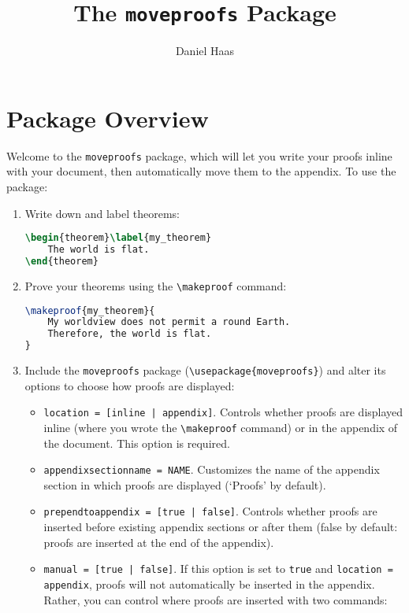 \documentclass{article}
\title{\vspace{-2.75cm}The \texttt{moveproofs} Package}
\author{Daniel Haas}
\newtheorem{theorem}{Theorem}
\begin{document}
\maketitle

\section{Package Overview}
Welcome to the \texttt{moveproofs} package, which will let you write your proofs inline with your document, then automatically move them to the appendix.
To use the package:
\begin{enumerate}
    \item Write down and label theorems:
\begin{lstlisting}[language=TeX, moretexcs={begin, label}]
\begin{theorem}\label{my_theorem}
    The world is flat.
\end{theorem}
\end{lstlisting}
    \item Prove your theorems using the \texttt{\textbackslash makeproof} command:
\begin{lstlisting}[language=TeX, moretexcs={begin, label, makeproof}]
\makeproof{my_theorem}{
    My worldview does not permit a round Earth.
    Therefore, the world is flat.
}
\end{lstlisting}
    \item Include the \texttt{moveproofs} package (\texttt{\textbackslash usepackage\{moveproofs\}}) and alter its options to choose how proofs are displayed:
        \begin{itemize}
        \item \texttt{location = [inline | appendix]}. Controls whether proofs are displayed inline (where you wrote the \texttt{\textbackslash makeproof} command) or in the appendix of the document. This option is required.
        \item \texttt{appendixsectionname = NAME}. Customizes the name of the appendix section in which proofs are displayed (`Proofs' by default).
        \item \texttt{prependtoappendix = [true | false]}. Controls whether proofs are inserted before existing appendix sections or after them (false by default: proofs are inserted at the end of the appendix).
        \item \texttt{manual = [true | false]}. If this option is set to \texttt{true} and \texttt{location = appendix}, proofs will not automatically be inserted in the appendix. Rather, you can control where proofs are inserted with two commands:

\end{itemize}
\end{enumerate}
\end{document}

